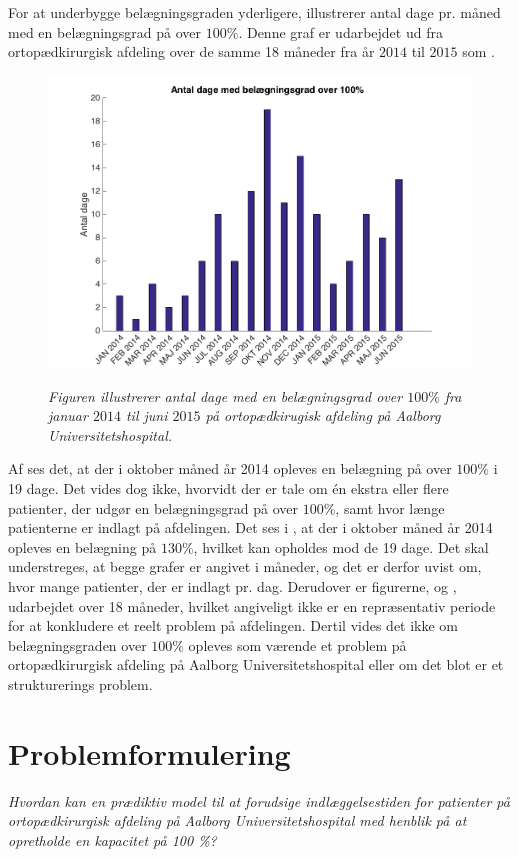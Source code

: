 For at underbygge belægningsgraden yderligere, illustrerer  antal dage pr. måned med en belægningsgrad på over $100 \%$. Denne graf er udarbejdet ud fra ortopædkirurgisk afdeling over de samme 18 måneder fra år $2014$ til $2015$ som . \cite{SDS2015} 

\begin{figure}[H]
	\flushleft 
	\centering
	\includegraphics[scale=.7]{figures/antaldage.png}
	\label{antaldage}
	\flushleft
	\caption{\textit{Figuren illustrerer antal dage med en belægningsgrad over $100 \%$ fra januar 			$2014$ til juni $2015$ på ortopædkirugisk afdeling på Aalborg Universitetshospital. 					\cite{SDS2015}}}
\end{figure}

\noindent
Af  ses det, at der i oktober måned år 2014 opleves en belægning på over $100 \%$ i 19 dage. Det vides dog ikke, hvorvidt der er tale om én ekstra eller flere patienter, der udgør en belægningsgrad på over $100 \%$, samt hvor længe patienterne er indlagt på afdelingen. Det ses i , at der i oktober måned år 2014 opleves en belægning på $130 \%$, hvilket kan opholdes mod de 19 dage. Det skal understreges, at begge grafer er angivet i måneder, og det er derfor uvist om, hvor mange patienter, der er indlagt pr. dag. Derudover er figurerne,  og , udarbejdet over 18 måneder, hvilket angiveligt ikke er en repræsentativ periode for at konkludere et reelt problem på afdelingen. Dertil vides det ikke om belægningsgraden over $100 \%$ opleves som værende et problem på ortopædkirurgisk afdeling på Aalborg Universitetshospital eller om det blot er et strukturerings problem. 

\section{Problemformulering}
\textit{Hvordan kan en prædiktiv model til at forudsige indlæggelsestiden for patienter på ortopædkirurgisk afdeling på Aalborg Universitetshospital med henblik på at opretholde en kapacitet på 100 \%?}
